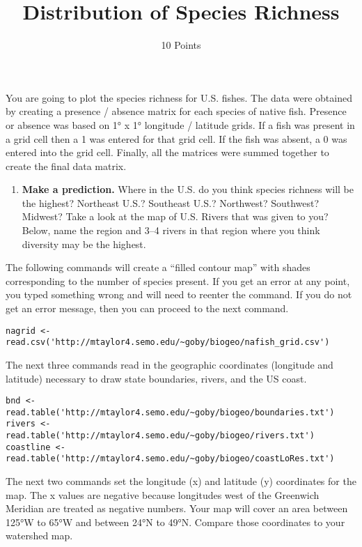 \documentclass[11pt]{article}
\title{Distribution of Species Richness}
\author{10 Points}
\date{}                                           %
\begin{document}
\maketitle
\thispagestyle{empty}

You are going to plot the species richness for U.S. fishes. The data were
obtained by creating a presence / absence matrix for each species of
native fish. Presence or absence was based on 1° x 1° longitude /
latitude grids. If a fish was present in a grid cell then a 1 was
entered for that grid cell. If the fish was absent, a 0 was entered into
the grid cell. Finally, all the matrices were summed together to create
the final data matrix.

\begin{enumerate}[leftmargin=*]
\item \textbf{Make a prediction.} Where in the U.S. 
do you think species richness will be the highest? Northeast U.S.? Southeast
U.S.? Northwest? Southwest? Midwest? Take a look at the map of U.S. 
Rivers that was given to you?  Below, name the region and 3--4 rivers in that 
region where you think diversity may be the highest.\vspace{10\baselineskip}
\end{enumerate}

The following commands will create a ``filled contour map'' with shades
corresponding to the number of species present. If you get an error at
any point, you typed something wrong and will need to reenter the
command. If you do not get an error message, then you can proceed to the
next command.

\begin{verbatim}
nagrid <- read.csv('http://mtaylor4.semo.edu/~goby/biogeo/nafish_grid.csv')
\end{verbatim}

The next three commands read in the geographic coordinates (longitude
and latitude) necessary to draw state boundaries, rivers, and the US
coast.

\begin{verbatim}
bnd <- read.table('http://mtaylor4.semo.edu/~goby/biogeo/boundaries.txt')
rivers <- read.table('http://mtaylor4.semo.edu/~goby/biogeo/rivers.txt')
coastline <- read.table('http://mtaylor4.semo.edu/~goby/biogeo/coastLoRes.txt')
\end{verbatim}

The next two commands set the longitude (x) and latitude (y) coordinates
for the map. The x values are negative because longitudes west of the
Greenwich Meridian are treated as negative numbers. Your map will cover
an area between 125°W to 65°W and between 24°N to 49°N. Compare those
coordinates to your watershed map.
\end{document}
